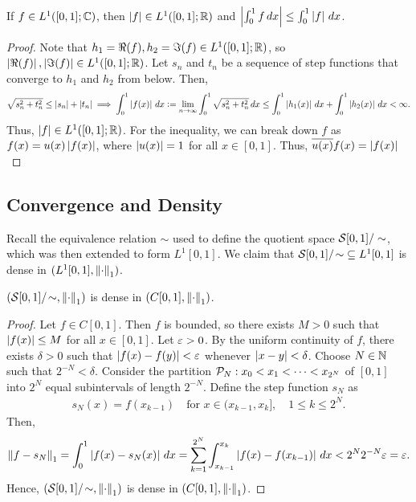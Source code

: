 \begin{theorem}
    If $f \in L^{1}([0,1];\mathbb{C})$, then $\left| f \right| \in L^{1}([0,1];\mathbb{R})$ and $\left| \int_{0}^{1} f \, dx \right| \leq \int_{0}^{1} \left| f \right| \, dx$.
\end{theorem}
\begin{proof}
    Note that $h_{1}=\Re(f),h_{2}=\Im(f) \in L^{1}([0,1];\mathbb{R})$, so $\left| \Re(f) \right|,\left| \Im(f) \right| \in L^{1}([0,1];\mathbb{R})$. Let $s_{n}$ and $t_{n}$ be a sequence of step functions that converge to $h_{1}$ and $h_{2}$ from below. Then,
    \begin{align}
        \sqrt{s_{n}^{2}+t_{n}^{2}} \leq \left| s_{n} \right| + \left| t_{n} \right| \implies \int_{0}^{1} \left| f(x) \right| \, dx \vcentcolon= \lim_{n \to \infty} \int_{0}^{1} \sqrt{s_{n}^{2}+t_{n}^{2}} \, dx \leq \int_{0}^{1} \left| h_{1}(x) \right| \, dx + \int_{0}^{1} \left| h_{2}(x) \right| \, dx < \infty.
    \end{align}
    Thus, $\left| f \right| \in L^{1}([0,1];\mathbb{R})$. For the inequality, we can break down $f$ as $f(x) = u(x)\left| f(x) \right|$, where $\left| u(x) \right| = 1$ for all $x \in [0,1]$. Thus, $\overline{u(x)}f(x) = \left| f(x) \right|$
\end{proof}

\subsection{Convergence and Density}

Recall the equivalence relation $\sim$  used to define the quotient space $\mathcal{S}[0,1]/\sim$, which was then extended to form $L^{1}[0,1]$. We claim that $\mathcal{S}[0,1]/\! \sim \; \subseteq L^{1}[0,1]$ is dense in $(L^{1}[0,1],\left\lVert\cdot\right\rVert_{1})$.

\begin{lemma}
    $(\mathcal{S}[0,1]/\! \sim, \left\lVert\cdot\right\rVert_{1})$ is dense in $(C[0,1],\left\lVert\cdot\right\rVert_{1})$.
\end{lemma}
\begin{proof}
    Let $f \in C[0,1]$. Then $f$ is bounded, so there exists $M > 0$ such that $\left| f(x) \right| \leq M$ for all $x \in [0,1]$. Let $\varepsilon > 0$. By the uniform continuity of $f$, there exists $\delta > 0$ such that $\left| f(x)-f(y) \right| < \varepsilon$ whenever $\left| x-y \right| < \delta$. Choose $N \in \mathbb{N}$ such that $2^{-N} < \delta$. Consider the partition $\mathcal{P}_{N}:x_{0} < x_{1} < \cdots < x_{2^{N}}$ of $[0,1]$ into $2^{N}$ equal subintervals of length $2^{-N}$. Define the step function $s_{N}$ as
    \begin{align}
        s_{N}(x) = f(x_{k-1}) \quad \text{for } x \in (x_{k-1},x_{k}], \quad 1 \leq k \leq 2^{N}.
    \end{align}
    Then,
    \begin{align}
        \left\lVert f-s_{N}\right\rVert_{1} = \int_{0}^{1} \left| f(x)-s_{N}(x) \right| \, dx = \sum_{k=1}^{2^{N}} \int_{x_{k-1}}^{x_{k}} \left| f(x)-f(x_{k-1}) \right| \, dx < 2^{N} 2^{-N} \varepsilon = \varepsilon.
    \end{align}
    Hence, $(\mathcal{S}[0,1]/\! \sim, \left\lVert\cdot\right\rVert_{1})$ is dense in $(C[0,1],\left\lVert\cdot\right\rVert_{1})$.
\end{proof}

